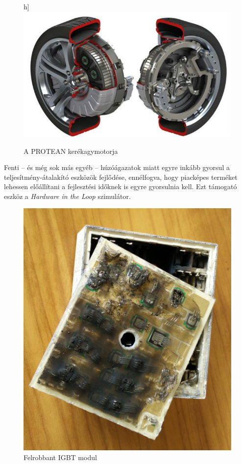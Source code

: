 \begin{figure}h]
	\centering
	\includegraphics[width = \textwidth]{figures/protean_motor.jpg}
	\caption{A PROTEAN kerékagymotorja} 
	\label{fig:protean}
\end{figure}

Fenti -- és még sok más egyéb -- húzóágazatok miatt egyre inkább gyorsul a teljesítmény-átalakító eszközök fejlődése, ennélfogva, hogy piacképes terméket lehessen előállítani a fejlesztési időknek is egyre gyorsulnia kell. Ezt támogató eszköz a \emph{Hardware in the Loop} szimulátor. 


\begin{figure}[h]
	\centering
	\includegraphics[scale = 0.1]{figures/IMG_20160415_134241.jpg}
	\caption{Felrobbant IGBT modul} 
	\label{fig:blown}
\end{figure}


